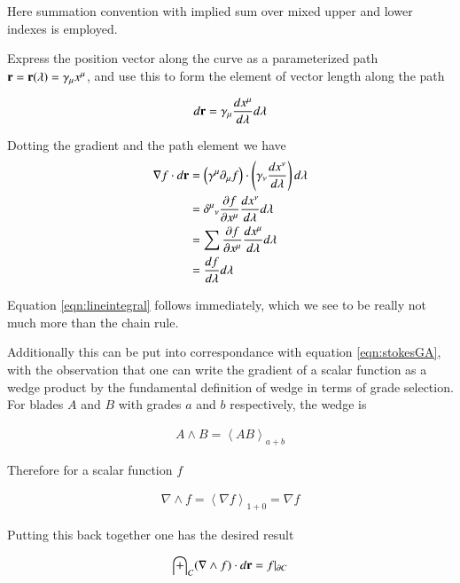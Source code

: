 \documentclass{article}
\newcommand{\grad}[0]{\nabla}
\newcommand{\PD}[2]{\frac{\partial {#2}}{\partial {#1}}}
\newcommand{\gpgrade}[2] {{\left\langle{{#1}}\right\rangle}_{#2}}
\begin{document}
Here summation convention with implied sum over mixed upper and lower indexes is employed.

Express the position vector along the curve as
a parameterized path $\mathbf{r} = \mathbf{r}(\lambda) = \gamma_{\mu} x^{\mu}$, and use
this to form the element of vector length along the path

\begin{equation*}
d\mathbf{r} = \gamma_{\mu} \frac{d x^{\mu}}{d\lambda} d\lambda
\end{equation*}

Dotting the gradient and the path element we have
\begin{align*}
\grad f \cdot d\Br 
&= \left(\gamma^{\mu} \partial_{\mu} f\right) \cdot \left(\gamma_{\nu} \frac{d x^{\nu}}{d\lambda} \right) d\lambda \\
&= {\delta^{\mu}}_{\nu} \PD{x^{\mu}}{f} \frac{d x^{\nu}}{d\lambda} d\lambda \\
&= \sum \PD{x^{\mu}}{f} \frac{d x^{\mu}}{d\lambda} d\lambda \\
&= \frac{d f}{d \lambda} d\lambda
\end{align*}

Equation \ref{eqn:lineintegral} follows immediately, which we see to be really not much more than the chain rule.

Additionally this can be put into correspondance with equation \ref{eqn:stokesGA}, with the observation that one can write the gradient of a scalar function as a wedge product by the fundamental definition of wedge in terms of grade selection.  For blades $A$ and $B$ with grades $a$ and $b$ respectively, the wedge is

\begin{align*}
A \wedge B = \gpgrade{AB}{a+b}
\end{align*}

Therefore for a scalar function $f$

\begin{align*}
\grad \wedge f = \gpgrade{\grad f}{1+0} = \grad f
\end{align*}

Putting this back together one has the desired result

\begin{equation}\label{eqn:lineintegralwedge}
\int_C (\grad \wedge f) \cdot d\Br = f \vert_{\partial C}
\end{equation}
\end{document}
